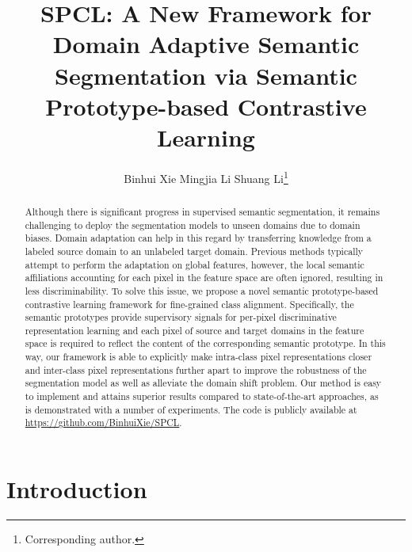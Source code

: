 \documentclass[runningheads]{llncs}
\begin{document}
\pagestyle{headings}
\mainmatter

\title{SPCL: A New Framework for Domain Adaptive Semantic Segmentation via Semantic Prototype-based Contrastive Learning} 

\titlerunning{~}

\author{Binhui Xie \quad Mingjia Li \quad Shuang Li\thanks{Corresponding author.}}

\authorrunning{~}



\maketitle

\begin{abstract}
Although there is significant progress in supervised semantic segmentation, it remains challenging to deploy the segmentation models to unseen domains due to domain biases. Domain adaptation can help in this regard by transferring knowledge from a labeled source domain to an unlabeled target domain. Previous methods typically attempt to perform the adaptation on global features, however, the local semantic affiliations accounting for each pixel in the feature space are often ignored, resulting in less discriminability. To solve this issue, we propose a novel semantic prototype-based contrastive learning framework for fine-grained class alignment. Specifically, the semantic prototypes provide supervisory signals for per-pixel discriminative representation learning and each pixel of source and target domains in the feature space is required to reflect the content of the corresponding semantic prototype. In this way, our framework is able to explicitly make intra-class pixel representations closer and inter-class pixel representations further apart to improve the robustness of the segmentation model as well as alleviate the domain shift problem. Our method is easy to implement and attains superior results compared to state-of-the-art approaches, as is demonstrated with a number of experiments. The code is publicly available at \url{https://github.com/BinhuiXie/SPCL}.
\end{abstract}


\section{Introduction}
\end{document}
